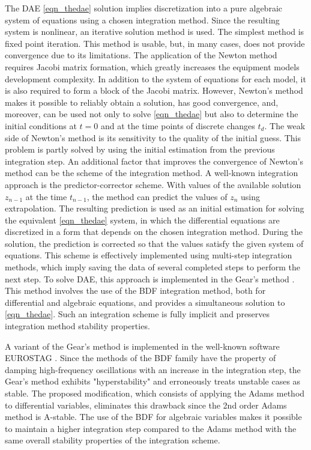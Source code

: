 \documentclass[lettersize,journal]{IEEEtran}
\begin{document}
The DAE \eqref{eqn_thedae} solution implies discretization into a pure algebraic system of equations using a chosen integration method. Since the resulting system is nonlinear, an iterative solution method is used. The simplest method is fixed point iteration. This method is usable, but, in many cases, does not provide convergence due to its limitations. The application of the Newton method requires Jacobi matrix formation, which greatly increases the equipment models development complexity. In addition to the system of equations for each model, it is also required to form a block of the Jacobi matrix. However, Newton's method makes it possible to reliably obtain a solution, has good convergence, and, moreover, can be used not only to solve \eqref{eqn_thedae} but also to determine the initial conditions at \(t=0\) and at the time points of discrete changes \(t_d\). The weak side of Newton's method is its sensitivity to the quality of the initial guess. This problem is partly solved by using the initial estimation from the previous integration step. An additional factor that improves the convergence of Newton's method can be the scheme of the integration method. A well-known integration approach is the predictor-corrector scheme. With values of the available solution \(z_{n-1}\) at the time \(t_{n-1}\), the method can predict the values of \(z_n\) using extrapolation. The resulting prediction is used as an initial estimation for solving the equivalent \eqref{eqn_thedae} system, in which the differential equations are discretized in a form that depends on the chosen integration method. During the solution, the prediction is corrected so that the values satisfy the given system of equations. This scheme is effectively implemented using multi-step integration methods, which imply saving the data of several completed steps to perform the next step. To solve DAE, this approach is implemented in the Gear's method \cite{gear71}. This method involves the use of the BDF integration method, both for differential and algebraic equations, and provides a simultaneous solution to \eqref{eqn_thedae}. Such an integration scheme is fully implicit and preserves integration method stability properties.

A variant of the Gear's method is implemented in the well-known software EUROSTAG \cite{mixedadams}. Since the methods of the BDF family have the property of damping high-frequency oscillations with an increase in the integration step, the Gear's method exhibits "hyperstability" and erroneously treats unstable cases as stable. The proposed modification, which consists of applying the Adams method to differential variables, eliminates this drawback since the 2nd order Adams method is A-stable. The use of the BDF for algebraic variables makes it possible to maintain a higher integration step compared to the Adams method with the same overall stability properties of the integration scheme.
\end{document}

